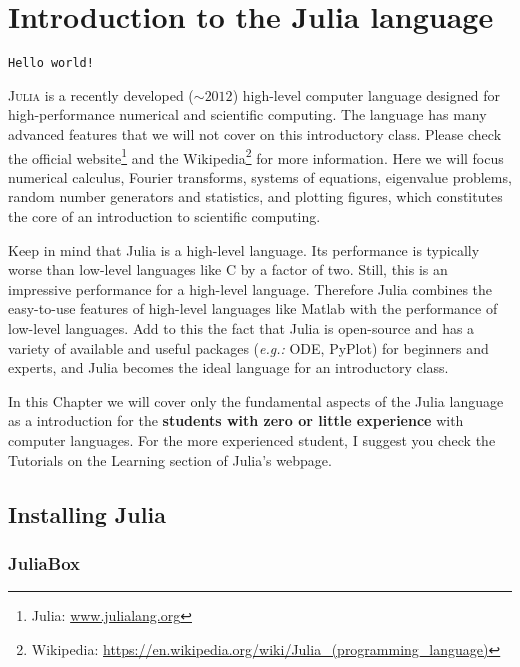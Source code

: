 \def \julia {\textbf{\textcolor{darkgreen}{julia>}}}

\chapter{Introduction to the Julia language}
\vspace*{-1cm}
\begin{flushright}
\texttt{Hello world!}
\end{flushright}

\lettrine[nindent=0.35em,lhang=0.40,loversize=0.3]{J}{ulia} is a recently developed ($\sim 2012$) high-level computer language designed for high-performance numerical and scientific computing. The language has many advanced features that we will not cover on this introductory class. Please check the official website\footnote{Julia: \url{www.julialang.org}} and the Wikipedia\footnote{Wikipedia: \url{https://en.wikipedia.org/wiki/Julia_(programming_language)}} for more information. Here we will focus numerical calculus, Fourier transforms, systems of equations, eigenvalue problems, random number generators and statistics, and plotting figures, which constitutes the core of an introduction to scientific computing.

Keep in mind that Julia is a high-level language. Its performance is typically worse than low-level languages like C by a factor of two. Still, this is an impressive performance for a high-level language. Therefore Julia combines the easy-to-use features of high-level languages like Matlab with the performance of low-level languages. Add to this the fact that Julia is open-source and has a variety of available and useful packages (\textit{e.g.:} ODE, PyPlot) for beginners and experts, and Julia becomes the ideal language for an introductory class.

In this Chapter we will cover only the fundamental aspects of the Julia language as a introduction for the \textbf{students with zero or little experience} with computer languages. For the more experienced student, I suggest you check the Tutorials on the Learning section of Julia's webpage.


\section{Installing Julia }

\subsection{JuliaBox}

